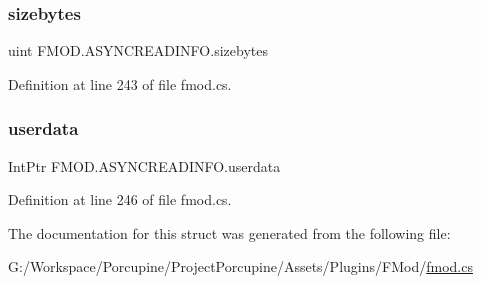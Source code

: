 \subsubsection{\texorpdfstring{sizebytes}{sizebytes}}
{\footnotesize\ttfamily uint F\+M\+O\+D.\+A\+S\+Y\+N\+C\+R\+E\+A\+D\+I\+N\+F\+O.\+sizebytes}



Definition at line 243 of file fmod.\+cs.

\mbox{\label{struct_f_m_o_d_1_1_a_s_y_n_c_r_e_a_d_i_n_f_o_ad99c7774b25ef56436d17cf7a60f9814}} 
\subsubsection{\texorpdfstring{userdata}{userdata}}
{\footnotesize\ttfamily Int\+Ptr F\+M\+O\+D.\+A\+S\+Y\+N\+C\+R\+E\+A\+D\+I\+N\+F\+O.\+userdata}



Definition at line 246 of file fmod.\+cs.



The documentation for this struct was generated from the following file\+:\begin{DoxyCompactItemize}
\item 
G\+:/\+Workspace/\+Porcupine/\+Project\+Porcupine/\+Assets/\+Plugins/\+F\+Mod/\hyperlink{fmod_8cs}{fmod.\+cs}\end{DoxyCompactItemize}

